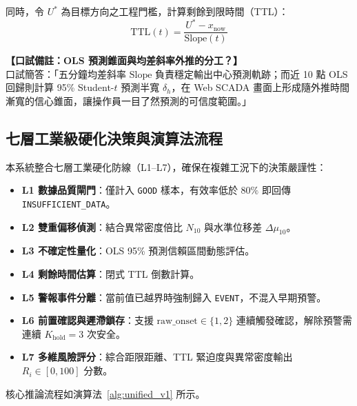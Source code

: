 \documentclass[fontset=none, a4paper, 12pt]{ctexart}
\begin{document}
\begin{doublespace}
同時，令 $U^*$ 為目標方向之工程門檻，計算剩餘到限時間（TTL）：
\begin{equation}
\mathrm{TTL}(t) = \frac{U^* - x_{\mathrm{now}}}{\mathrm{Slope}(t)}
\label{eq:ttl}
\end{equation}

\noindent\textbf{【口試備註：OLS 預測錐面與均差斜率外推的分工？】}\\
口試簡答：「五分鐘均差斜率 $\mathrm{Slope}$ 負責穩定輸出中心預測軌跡；而近 10 點 OLS 回歸則計算 95\% Student-$t$ 預測半寬 $\delta_h$，在 Web SCADA 畫面上形成隨外推時間漸寬的信心錐面，讓操作員一目了然預測的可信度範圍。」

\subsection{七層工業級硬化決策與演算法流程}
本系統整合七層工業硬化防線（L1–L7），確保在複雜工況下的決策嚴謹性：
\begin{itemize}
    \item \textbf{L1 數據品質閘門}：僅計入 \texttt{GOOD} 樣本，有效率低於 $80\%$ 即回傳 \texttt{INSUFFICIENT\_DATA}。
    \item \textbf{L2 雙重偏移偵測}：結合異常密度倍比 $N_{10}$ 與水準位移差 $\Delta\mu_{10}$。
    \item \textbf{L3 不確定性量化}：OLS 95\% 預測信賴區間動態評估。
    \item \textbf{L4 剩餘時間估算}：閉式 TTL 倒數計算。
    \item \textbf{L5 警報事件分離}：當前值已越界時強制歸入 \texttt{EVENT}，不混入早期預警。
    \item \textbf{L6 前置確認與遲滯鎖存}：支援 $\text{raw\_onset} \in \{1, 2\}$ 連續觸發確認，解除預警需連續 $K_{\mathrm{hold}}=3$ 次安全。
    \item \textbf{L7 多維風險評分}：綜合距限距離、TTL 緊迫度與異常密度輸出 $R_i \in [0, 100]$ 分數。
\end{itemize}

核心推論流程如演算法~\ref{alg:unified_v1} 所示。


\end{doublespace}
\end{document}
